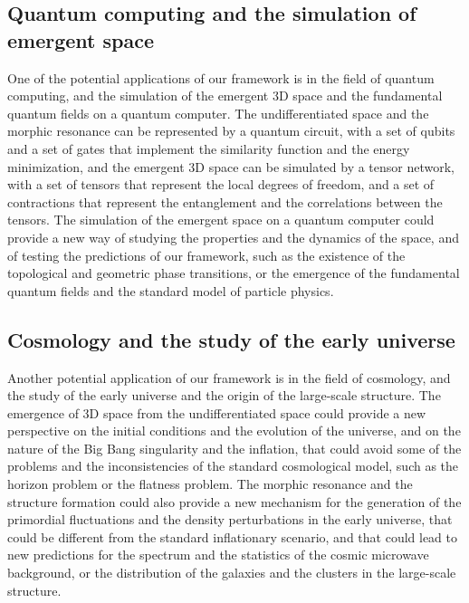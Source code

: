 \subsection{Quantum computing and the simulation of emergent space}
One of the potential applications of our framework is in the field of quantum computing, and the simulation of the emergent 3D space and the fundamental quantum fields on a quantum computer. The undifferentiated space and the morphic resonance can be represented by a quantum circuit, with a set of qubits and a set of gates that implement the similarity function and the energy minimization, and the emergent 3D space can be simulated by a tensor network, with a set of tensors that represent the local degrees of freedom, and a set of contractions that represent the entanglement and the correlations between the tensors. The simulation of the emergent space on a quantum computer could provide a new way of studying the properties and the dynamics of the space, and of testing the predictions of our framework, such as the existence of the topological and geometric phase transitions, or the emergence of the fundamental quantum fields and the standard model of particle physics.

\subsection{Cosmology and the study of the early universe}
Another potential application of our framework is in the field of cosmology, and the study of the early universe and the origin of the large-scale structure. The emergence of 3D space from the undifferentiated space could provide a new perspective on the initial conditions and the evolution of the universe, and on the nature of the Big Bang singularity and the inflation, that could avoid some of the problems and the inconsistencies of the standard cosmological model, such as the horizon problem or the flatness problem. The morphic resonance and the structure formation could also provide a new mechanism for the generation of the primordial fluctuations and the density perturbations in the early universe, that could be different from the standard inflationary scenario, and that could lead to new predictions for the spectrum and the statistics of the cosmic microwave background, or the distribution of the galaxies and the clusters in the large-scale structure.

